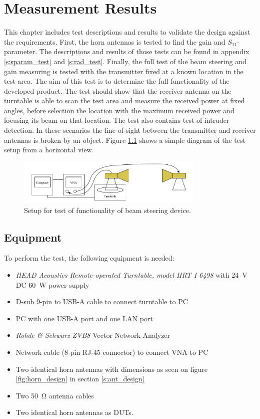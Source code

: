 \chapter{Measurement Results} \label{s:accept_test}
This chapter includes test descriptions and results to validate the design against the requirements. First, the horn antennas is tested to find the gain and $S_{11}$-parameter. The descriptions and results of those tests can be found in appendix \ref{s:sparam_test} and \ref{s:rad_test}. Finally, the full test of the beam steering and gain measuring is tested with the transmitter fixed at a known location in the test area. The aim of this test is to determine the full functionality of the developed product. The test should show that the receiver antenna on the turntable is able to scan the test area and measure the received power at fixed angles, before selection the location with the maximum received power and focusing its beam on that location. The test also contains test of intruder detection. In these scenarios the line-of-sight between the transmitter and receiver antennas is broken by an object. Figure \ref{fig:experiment-setup} shows a simple diagram of the test setup from a horizontal view.

\begin{figure}[H]
    \centering
    \includegraphics[width=0.8\textwidth]{figures/accept_test_setup.pdf}
    \caption{Setup for test of functionality of beam steering device.} \label{fig:experiment-setup}
\end{figure}

\section{Equipment}
To perform the test, the following equipment is needed:

\begin{itemize}
    \item \textit{HEAD Acoustics Remote-operated Turntable, model HRT I 6498} with \SI{24}{\volt} DC \SI{60}{W} power supply
    \item D-sub 9-pin to USB-A cable to connect turntable to PC
    \item PC with one USB-A port and one LAN port
    \item \textit{Rohde \& Schwarz ZVB8} Vector Network Analyzer
    \item Network cable (8-pin RJ-45 connector) to connect VNA to PC
    \item Two identical horn antennas with dimensions as seen on figure \ref{fig:horn_design} in section \ref{s:ant_design}
    \item Two \SI{50}{\ohm} antenna cables
    \item Two identical horn antennas as DUTs.
\end{itemize}

